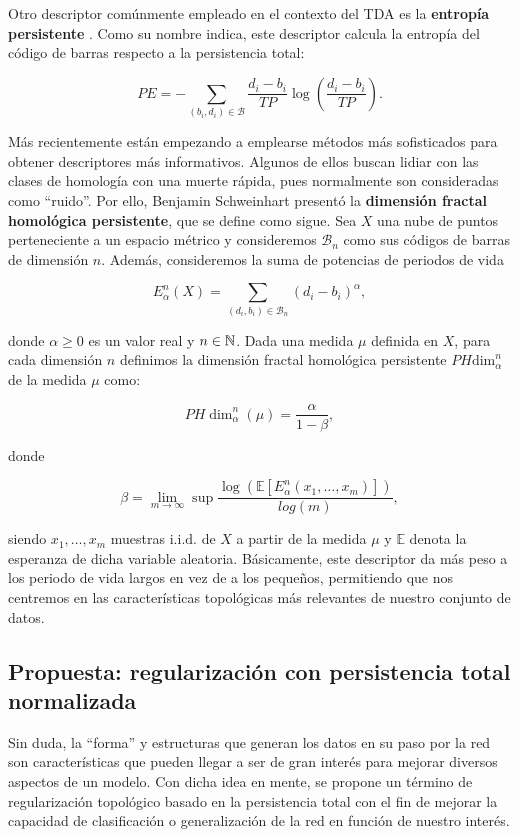 Otro descriptor comúnmente empleado en el contexto del TDA es la \textbf{entropía persistente} \cite{rucco2016characterisation}. Como su nombre indica, este descriptor calcula la entropía del código de barras respecto a la persistencia total:

\[
PE = - \sum_{(b_i, d_i)\in \mathcal{B}} \frac{d_i - b_i}{TP}\log\left(\frac{d_i - b_i}{TP}\right).
\]

Más recientemente están empezando a emplearse métodos más sofisticados para obtener descriptores más informativos. Algunos de ellos buscan lidiar con las clases de homología con una muerte rápida, pues normalmente son consideradas como \enquote{ruido}. Por ello, Benjamin Schweinhart \cite{schweinhart2020fractaldimensionpersistenthomology} presentó la \textbf{dimensión fractal homológica persistente}, que se define como sigue. Sea $X$ una nube de puntos perteneciente a un espacio métrico y consideremos $\mathcal{B}_n$ como sus códigos de barras de dimensión $n$. Además, consideremos la suma de potencias de periodos de vida

\[
E_\alpha^n(X) = \sum_{(d_i, b_i) \in \mathcal{B}_n} (d_i - b_i)^\alpha,
\]

donde $\alpha \geq 0$ es un valor real y $n \in \mathbb{N}$. Dada una medida $\mu$ definida en $X$, para cada dimensión $n$ definimos la dimensión fractal homológica persistente $PH\text{dim}_\alpha^n$ de la medida $\mu$ como:

\[
PH\dim_\alpha^n(\mu) = \frac{\alpha}{1 - \beta},
\]

donde

\[
\beta = \lim_{m \to \infty} \sup \frac{\log\left(\mathbb{E}\left[ E_\alpha^n(x_1, \dots, x_m)\right]\right)}{log(m)},
\]

siendo $x_1, \dots, x_m$ muestras $\text{i.i.d.}$ de $X$ a partir de la medida $\mu$ y $\mathbb{E}$ denota la esperanza de dicha variable aleatoria. Básicamente, este descriptor da más peso a los periodo de vida largos en vez de a los pequeños, permitiendo que nos centremos en las características topológicas más relevantes de nuestro conjunto de datos.

\subsection{Propuesta: regularización con persistencia total normalizada}
\label{subsec:regularizer}

Sin duda, la \enquote{forma} y estructuras que generan los datos en su paso por la red son características que pueden llegar a ser de gran interés para mejorar diversos aspectos de un modelo. Con dicha idea en mente, se propone un término de regularización topológico basado en la persistencia total con el fin de mejorar la capacidad de clasificación o generalización de la red en función de nuestro interés. 

